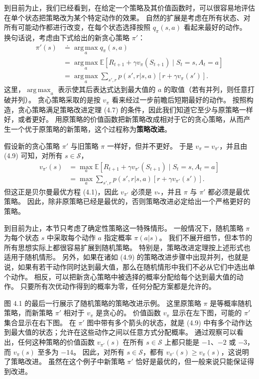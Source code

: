 \documentclass[UTF8, 12pt, fontset=fandol, oneside]{ctexart}
\begin{document}
到目前为止，我们已经看到，在给定一个策略及其价值函数时，可以很容易地评估在单个状态把策略改为某个特定动作的效果。
自然的扩展是考虑在所有状态、对所有可能动作都进行改变，在每个状态选择按照 $q_\pi(s,a)$ 看起来最好的动作。
换句话说，考虑由下式给出的新贪心策略 $\pi'$：
\begin{equation}
\begin{aligned}
\pi'(s)
&\doteq \operatorname*{arg\,max}_a q_\pi(s,a)\\
&= \operatorname*{arg\,max}_a \mathbb{E}[R_{t+1}+\gamma v_\pi(S_{t+1})\mid S_t=s,A_t=a] \\
&= \operatorname*{arg\,max}_a \sum_{s',r}p(s',r|s,a)\left[r+\gamma v_\pi(s')\right].
\end{aligned}
\tag{4.9}
\end{equation}
这里，$\operatorname*{arg\,max}_a$ 表示使其后表达式达到最大值的 $a$ 的取值（若有并列，则任意打破并列）。
贪心策略采取的是按 $v_\pi$ 看来经过一步前瞻后短期最好的动作。
按照构造，贪心策略满足策略改进定理 (4.7) 的条件，因此我们知道它至少与原策略一样好，或者更好。
用原策略的价值函数把新策略改成相对于它的贪心策略，从而产生一个优于原策略的新策略，这个过程称为\textbf{策略改进}。

假设新的贪心策略 $\pi'$ 与旧策略 $\pi$ 一样好，但并不更好。
于是 $v_\pi=v_{\pi'}$，并且由 (4.9) 可知，对所有 $s\in\mathcal{S}$，
\[
\begin{aligned}
v_{\pi'}(s)
&= \max_a \mathbb{E}[R_{t+1}+\gamma v_{\pi'}(S_{t+1})\mid S_t=s,A_t=a]\\
&= \max_a \sum_{s',r}p(s',r|s,a)\left[r+\gamma v_{\pi'}(s')\right].
\end{aligned}
\]
但这正是贝尔曼最优方程 (4.1)，因此 $v_{\pi'}$ 必须是 $v_*$，并且 $\pi$ 与 $\pi'$ 都必须是最优策略。
因此，除非原策略已经是最优的，否则策略改进必定给出一个严格更好的策略。

到目前为止，本节只考虑了确定性策略这一特殊情形。
一般情况下，随机策略 $\pi$ 为每个状态 $s$ 中采取每个动作 $a$ 指定概率 $\pi(a|s)$。
我们不展开细节，但本节的所有思想实际上都很容易扩展到随机策略。
特别是，策略改进定理按上述形式也适用于随机情形。
另外，如果在诸如 (4.9) 的策略改进步骤中出现并列，也就是说，如果有若干动作同时达到最大值，那么在随机情形中我们不必从它们中选出单个动作。
相反，可以把新贪心策略中被选择的概率分配给每个达到最大值的动作。
只要所有次优动作得到的概率为零，任何分配方案都是允许的。

图 4.1 的最后一行展示了随机策略的策略改进示例。
这里原策略 $\pi$ 是等概率随机策略，而新策略 $\pi'$ 相对于 $v_\pi$ 是贪心的。
价值函数 $v_\pi$ 显示在左下图，可能的 $\pi'$ 集合显示在右下图。
在 $\pi'$ 图中带有多个箭头的状态，就是 (4.9) 中有多个动作达到最大值的状态；允许在这些动作之间以任意方式分配概率。
通过观察可以看出，任何这种策略的价值函数 $v_{\pi'}(s)$ 在所有 $s\in\mathcal{S}$ 上都只能是 $-1$、$-2$ 或 $-3$，而 $v_\pi(s)$ 至多为 $-14$。
因此，对所有 $s\in\mathcal{S}$，都有 $v_{\pi'}(s)\ge v_\pi(s)$，这说明了策略改进。
虽然在这个例子中新策略 $\pi'$ 恰好是最优的，但一般来说只能保证得到改进。
\end{document}
